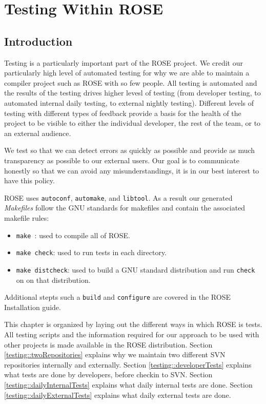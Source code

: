 %
%

\chapter{Testing Within ROSE}
\label{testing::overviewOfTesting}

\section{Introduction}
   Testing is a particularly important part of the ROSE project.
We credit our particularly high level of automated testing for
why we are able to maintain a compiler project such as ROSE
with so few people.  All testing is automated and the results
of the testing drives higher levesl of testing (from
developer testing, to automated internal daily testing, to
external nightly testing).  Different levels of testing
with different types of feedback provide a basis for the health
of the project to be visible to either the individual developer,
the rest of the team, or to an external audience.

   We test so that we can detect errors as quickly as possible and
provide as much transparency as possible to our external users.
Our goal is to communicate honestly so that we can avoid any 
misunderstandings, it is in our best interest to have this
policy.

   ROSE uses {\tt autoconf}, {\tt automake}, and {\tt libtool}.
As a result our generated {\em Makefiles} follow the GNU
standards for makefiles and contain the associated makefile rules:
\begin{itemize}
   \item {\tt make }: used to compile all of ROSE.
   \item {\tt make check}: used to run tests in each directory.
   \item {\tt make distcheck}: used to build a GNU standard distribution and run {\tt check} on
    on that distribution.
\end{itemize}
Additional stepts such a {\tt build} and {\tt configure} are covered in the
ROSE Installation guide.

This chapter is organized by laying out the different
ways in which ROSE is tests.  All testing scripts and the information
required for our approach to be used with other projects is made available
in the ROSE distribution. 
Section \ref{testing::twoRepositories} explains why we maintain two
different SVN repositories internally and externally.
Section \ref{testing::developerTests} explains what tests are done by developers, before checkin to SVN.
Section \ref{testing::dailyInternalTests} explains what daily internal tests are done.
Section \ref{testing::dailyExternalTests} explains what daily external tests are done.

